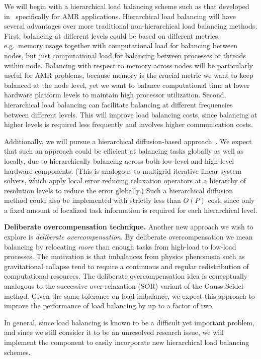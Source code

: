 \documentclass[10pt,twocolumn]{article}
\begin{document}
We will begin with a hierarchical load balancing scheme such as that
developed in~\cite{LaTa06} specifically for AMR applications.
Hierarchical load balancing will have several advantages over more
traditional non-hierarchical load balancing methods.  First,
balancing at different levels could be based on different metrics,
e.g.~memory usage together with computational load for balancing
between nodes, but just computational load for balancing between
processes or threads within node.  Balancing with respect to memory
across nodes will be particularly useful for AMR problems, because
memory is the crucial metric we want to keep balanced at the node
level, yet we want to balance computational time at lower hardware
platform levels to maintain high processor utilization.  Second,
hierarchical load balancing can facilitate balancing at different
frequencies between different levels.  This will improve load
balancing costs, since balancing at higher levels is required less
frequently and involves higher communication costs.

Additionally, we will pursue a hierarchical diffusion-based
approach~\cite{ScKa97}.  We expect that such an approach could be
efficient at balancing tasks globally as well as locally, due to
hierarchically balancing across both low-level and high-level hardware
components.  (This is analogous to multigrid iterative linear system
solvers, which apply local error reducing relaxation operators at a
hierarchy of resolution levels to reduce the error globally.)  Such a
hierarchical diffusion method could also be implemented with strictly
less than $O(P)$ cost, since only a fixed amount of localized task
information is required for each hierarchical level.

\textbf{Deliberate overcompensation technique.}
%
Another new approach we wish to explore is \textit{deliberate
  overcompensation}.  By deliberate overcompensation we mean
balancing by relocating \textit{more} than enough tasks from
high-load to low-load processes.  The motivation is that imbalances
from physics phenomena such as gravitational collapse tend to require
a continuous and regular redistribution of computational resources.
The deliberate overcompensation idea is conceptually analogous to the
successive over-relaxation (SOR) variant of the Gauss-Seidel method.
Given the same tolerance on load imbalance, we expect this approach to
improve the performance of load balancing by up to a factor of two.

In general, since load balancing is known to be a difficult yet
important problem, and since we still consider it to be an unresolved
research issue, we will implement the  component to
easily incorporate new hierarchical load balancing schemes.
\end{document}
